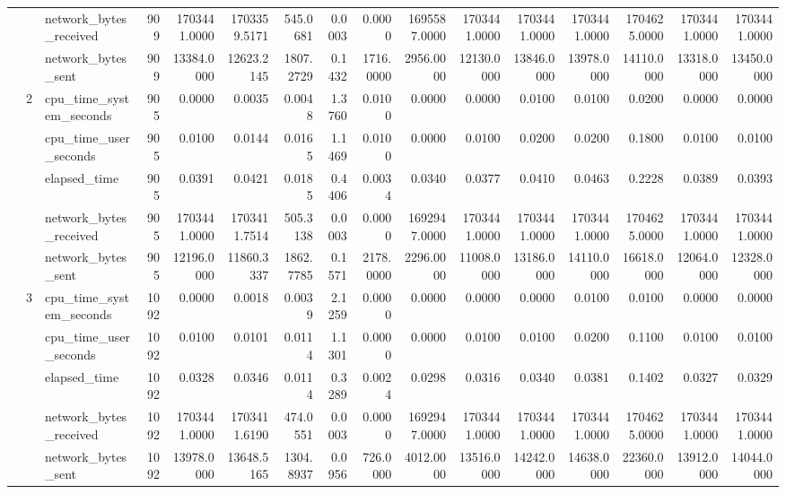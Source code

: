 \begin{tabular}{lllrrrrrrrrrrrrr}
 &  & network\_bytes\_received & 909 & 1703441.0000 & 1703359.5171 & 545.0681 & 0.0003 & 0.0000 & 1695587.0000 & 1703441.0000 & 1703441.0000 & 1703441.0000 & 1704625.0000 & 1703441.0000 & 1703441.0000 \\
 &  & network\_bytes\_sent & 909 & 13384.0000 & 12623.2145 & 1807.2729 & 0.1432 & 1716.0000 & 2956.0000 & 12130.0000 & 13846.0000 & 13978.0000 & 14110.0000 & 13318.0000 & 13450.0000 \\
\cline{2-16}
 & \multirow[t]{5}{*}{2} & cpu\_time\_system\_seconds & 905 & 0.0000 & 0.0035 & 0.0048 & 1.3760 & 0.0100 & 0.0000 & 0.0000 & 0.0100 & 0.0100 & 0.0200 & 0.0000 & 0.0000 \\
 &  & cpu\_time\_user\_seconds & 905 & 0.0100 & 0.0144 & 0.0165 & 1.1469 & 0.0100 & 0.0000 & 0.0100 & 0.0200 & 0.0200 & 0.1800 & 0.0100 & 0.0100 \\
 &  & elapsed\_time & 905 & 0.0391 & 0.0421 & 0.0185 & 0.4406 & 0.0034 & 0.0340 & 0.0377 & 0.0410 & 0.0463 & 0.2228 & 0.0389 & 0.0393 \\
 &  & network\_bytes\_received & 905 & 1703441.0000 & 1703411.7514 & 505.3138 & 0.0003 & 0.0000 & 1692947.0000 & 1703441.0000 & 1703441.0000 & 1703441.0000 & 1704625.0000 & 1703441.0000 & 1703441.0000 \\
 &  & network\_bytes\_sent & 905 & 12196.0000 & 11860.3337 & 1862.7785 & 0.1571 & 2178.0000 & 2296.0000 & 11008.0000 & 13186.0000 & 14110.0000 & 16618.0000 & 12064.0000 & 12328.0000 \\
\cline{2-16}
 & \multirow[t]{5}{*}{3} & cpu\_time\_system\_seconds & 1092 & 0.0000 & 0.0018 & 0.0039 & 2.1259 & 0.0000 & 0.0000 & 0.0000 & 0.0000 & 0.0100 & 0.0100 & 0.0000 & 0.0000 \\
 &  & cpu\_time\_user\_seconds & 1092 & 0.0100 & 0.0101 & 0.0114 & 1.1301 & 0.0000 & 0.0000 & 0.0100 & 0.0100 & 0.0200 & 0.1100 & 0.0100 & 0.0100 \\
 &  & elapsed\_time & 1092 & 0.0328 & 0.0346 & 0.0114 & 0.3289 & 0.0024 & 0.0298 & 0.0316 & 0.0340 & 0.0381 & 0.1402 & 0.0327 & 0.0329 \\
 &  & network\_bytes\_received & 1092 & 1703441.0000 & 1703411.6190 & 474.0551 & 0.0003 & 0.0000 & 1692947.0000 & 1703441.0000 & 1703441.0000 & 1703441.0000 & 1704625.0000 & 1703441.0000 & 1703441.0000 \\
 &  & network\_bytes\_sent & 1092 & 13978.0000 & 13648.5165 & 1304.8937 & 0.0956 & 726.0000 & 4012.0000 & 13516.0000 & 14242.0000 & 14638.0000 & 22360.0000 & 13912.0000 & 14044.0000 \\
\cline{1-16} \cline{2-16}

\end{tabular}
